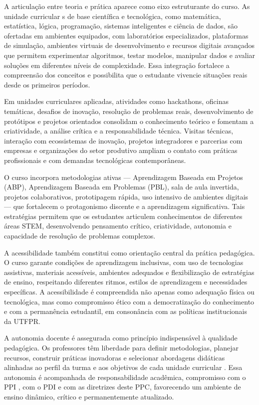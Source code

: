 A articulação entre teoria e prática aparece como eixo estruturante do curso. As unidade curricular s de base científica e tecnológica, como matemática, estatística, lógica, programação, sistemas inteligentes e ciência de dados, são ofertadas em ambientes equipados, com laboratórios especializados, plataformas de simulação, ambientes virtuais de desenvolvimento e recursos digitais avançados que permitem experimentar algoritmos, testar modelos, manipular dados e avaliar soluções em diferentes níveis de complexidade. Essa integração fortalece a compreensão dos conceitos e possibilita que o estudante vivencie situações reais desde os primeiros períodos.

Em unidades curriculares aplicadas, atividades como hackathons, oficinas temáticas, desafios de inovação, resolução de problemas reais, desenvolvimento de protótipos e projetos orientados consolidam o conhecimento teórico e fomentam a criatividade, a análise crítica e a responsabilidade técnica. Visitas técnicas, interação com ecossistemas de inovação, projetos integradores e parcerias com empresas e organizações do setor produtivo ampliam o contato com práticas profissionais e com demandas tecnológicas contemporâneas.

O curso incorpora metodologias ativas — Aprendizagem Baseada em Projetos (ABP), Aprendizagem Baseada em Problemas (PBL), sala de aula invertida, projetos colaborativos, prototipagem rápida, uso intensivo de ambientes digitais — que fortalecem o protagonismo discente e a aprendizagem significativa. Tais estratégias permitem que os estudantes articulem conhecimentos de diferentes áreas STEM, desenvolvendo pensamento crítico, criatividade, autonomia e capacidade de resolução de problemas complexos.

A acessibilidade também constitui como orientação central da prática pedagógica. O curso garante condições de aprendizagem inclusivas, com uso de tecnologias assistivas, materiais acessíveis, ambientes adequados e flexibilização de estratégias de ensino, respeitando diferentes ritmos, estilos de aprendizagem e necessidades específicas. A acessibilidade é compreendida não apenas como adequação física ou tecnológica, mas como compromisso ético com a democratização do conhecimento e com a permanência estudantil, em consonância com as políticas institucionais da UTFPR.

A autonomia docente é assegurada como princípio indispensável à qualidade pedagógica. Os professores têm liberdade para definir metodologias, planejar recursos, construir práticas inovadoras e selecionar abordagens didáticas alinhadas ao perfil da turma e aos objetivos de cada unidade curricular . Essa autonomia é acompanhada de responsabilidade acadêmica, compromisso com o PPI \cite{UTFPR_PPI_2019}, com o PDI \cite{UTFPR_PDI_2017, UTFPR_PDI_2023} e com as diretrizes deste PPC, favorecendo um ambiente de ensino dinâmico, crítico e permanentemente atualizado.

